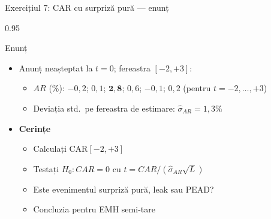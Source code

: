 \documentclass[9pt, aspectratio=169, t]{beamer}
\begin{document}
\begin{frame}[shrink=15]{Exercițiul 7: CAR cu surpriză pură --- enunț}
\begin{cminipage}{0.95\textwidth}
\begin{block}{Enunț}
\begin{itemize}\setlength{\itemsep}{0pt}
    \item Anunț neașteptat la $t = 0$; fereastra $[-2, +3]$:
    \begin{itemize}\setlength{\itemsep}{0pt}
        \item $AR$ (\%): $-0{,}2$; $0{,}1$; $\mathbf{2{,}8}$; $0{,}6$; $-0{,}1$; $0{,}2$ (pentru $t = -2, \ldots, +3$)
        \item Deviația std.\ pe fereastra de estimare: $\hat\sigma_{AR} = 1{,}3\%$
    \end{itemize}
\end{itemize}
\end{block}

\begin{itemize}\setlength{\itemsep}{0pt}
    \item \textbf{Cerințe}
    \begin{itemize}\setlength{\itemsep}{0pt}
        \item Calculați CAR$[-2, +3]$
        \item Testați $H_0: CAR = 0$ cu $t = CAR/(\hat\sigma_{AR}\sqrt{L})$
        \item Este evenimentul surpriză pură, leak sau PEAD?
        \item Concluzia pentru EMH semi-tare
    \end{itemize}
\end{itemize}
\end{cminipage}
\end{frame}
\end{document}
